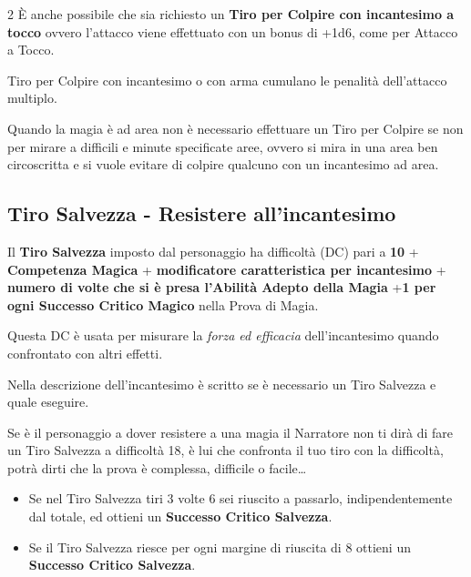 \begin{multicols}{2}
È anche possibile che sia richiesto un \textbf{Tiro per Colpire con incantesimo a tocco} ovvero l'attacco viene effettuato con un bonus di +1d6, come per Attacco a Tocco.

Tiro per Colpire con incantesimo o con arma cumulano le penalità dell'attacco multiplo.

\medskip

Quando la magia è ad area non è necessario effettuare un Tiro per Colpire se non per mirare a difficili e minute specificate aree, ovvero si mira in una area ben circoscritta e si vuole evitare di colpire qualcuno con un incantesimo ad area.

\subsection{Tiro Salvezza - Resistere all'incantesimo}\label{magietirosalvezza}\hypertarget{magietirosalvezza}{}

Il \textbf{Tiro Salvezza} imposto dal personaggio ha difficoltà (DC) pari a \textbf{10} + \textbf{Competenza Magica} + \textbf{modificatore caratteristica per incantesimo} + \textbf{numero di volte che si è presa l'Abilità Adepto della Magia} +\textbf{1 per ogni Successo Critico Magico} nella Prova di Magia.

Questa DC è usata per misurare la \emph{forza ed efficacia} dell'incantesimo quando confrontato con altri effetti.

Nella descrizione dell'incantesimo è scritto se è necessario un Tiro Salvezza e quale eseguire.

Se è il personaggio a dover resistere a una magia il Narratore non ti dirà di fare un Tiro Salvezza a difficoltà 18, è lui che confronta il tuo tiro con la difficoltà, potrà dirti che la prova è complessa, difficile o facile…

\begin{itemize}[leftmargin=*] \setlength{\itemsep}{0pt}

\item
Se nel Tiro Salvezza tiri 3 volte 6 sei riuscito a passarlo, indipendentemente dal totale, ed ottieni un \textbf{Successo Critico Salvezza}.

\item
Se il Tiro Salvezza riesce per ogni margine di riuscita di 8 ottieni un \textbf{Successo Critico Salvezza}.


\end{itemize}
\end{multicols}
